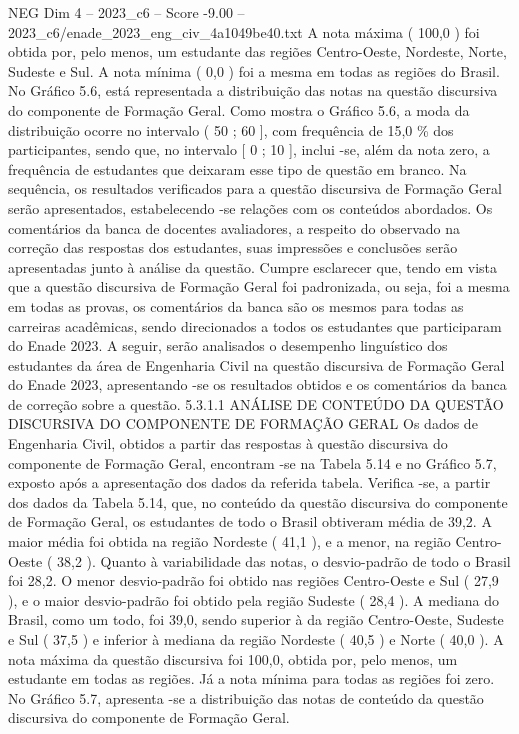 \begin{textsample}{NEG Dim 4 – 2023\_c6 – Score -9.00 – 2023\_c6/enade\_2023\_eng\_civ\_4a1049be40.txt}
A nota máxima ( 100,0 ) foi obtida por, pelo menos, um estudante das regiões Centro-Oeste, Nordeste, Norte, Sudeste e Sul.
A nota mínima ( 0,0 ) foi a mesma em todas as regiões do Brasil.
No Gráfico 5.6, está representada a distribuição das notas na questão discursiva do componente de Formação Geral.
Como mostra o Gráfico 5.6, a moda da distribuição ocorre no intervalo ( 50 ; 60 ], com frequência de 15,0 \% dos participantes, sendo que, no intervalo [ 0 ; 10 ], inclui -se, além da nota zero, a frequência de estudantes que deixaram esse tipo de questão em branco.
Na sequência, os resultados verificados para a questão discursiva de Formação Geral serão apresentados, estabelecendo -se relações com os conteúdos abordados.
Os comentários da banca de docentes avaliadores, a respeito do observado na correção das respostas dos estudantes, suas impressões e conclusões serão apresentadas junto à análise da questão.
Cumpre esclarecer que, tendo em vista que a questão discursiva de Formação Geral foi padronizada, ou seja, foi a mesma em todas as provas, os comentários da banca são os mesmos para todas as carreiras acadêmicas, sendo direcionados a todos os estudantes que participaram do Enade 2023.
A seguir, serão analisados o desempenho linguístico dos estudantes da área de Engenharia Civil na questão discursiva de Formação Geral do Enade 2023, apresentando -se os resultados obtidos e os comentários da banca de correção sobre a questão. 5.3.1.1 ANÁLISE DE CONTEÚDO DA QUESTÃO DISCURSIVA DO COMPONENTE DE FORMAÇÃO GERAL Os dados de Engenharia Civil, obtidos a partir das respostas à questão discursiva do componente de Formação Geral, encontram -se na Tabela 5.14 e no Gráfico 5.7, exposto após a apresentação dos dados da referida tabela.
Verifica -se, a partir dos dados da Tabela 5.14, que, no conteúdo da questão discursiva do componente de Formação Geral, os estudantes de todo o Brasil obtiveram média de 39,2.
A maior média foi obtida na região Nordeste ( 41,1 ), e a menor, na região Centro-Oeste ( 38,2 ).
Quanto à variabilidade das notas, o desvio-padrão de todo o Brasil foi 28,2.
O menor desvio-padrão foi obtido nas regiões Centro-Oeste e Sul ( 27,9 ), e o maior desvio-padrão foi obtido pela região Sudeste ( 28,4 ).
A mediana do Brasil, como um todo, foi 39,0, sendo superior à da região Centro-Oeste, Sudeste e Sul ( 37,5 ) e inferior à mediana da região Nordeste ( 40,5 ) e Norte ( 40,0 ).
A nota máxima da questão discursiva foi 100,0, obtida por, pelo menos, um estudante em todas as regiões.
Já a nota mínima para todas as regiões foi zero.
No Gráfico 5.7, apresenta -se a distribuição das notas de conteúdo da questão discursiva do componente de Formação Geral.

\end{textsample}
